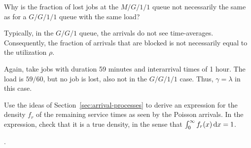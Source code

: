 \begin{question}
  Why is the fraction of lost jobs at the $M/G/1/1$ queue not
  necessarily the same as for a $G/G/1/1$ queue with the same load?  
  \begin{solution}
 Typically, in the $G/G/1$ queue, the arrivals do not see  time-averages. Consequently, the fraction of arrivals that are blocked is not necessarily equal to the utilization $\rho$.

  Again, take jobs with duration 59 minutes and interarrival times of
  1 hour. The load is $59/60$, but no job is lost, also not in the
  $G/G/1/1$ case. Thus, $\gamma=\lambda$ in this case.
  \end{solution}
\end{question}


\begin{question}[use=false]
  Use the ideas of Section~\ref{sec:arrival-processes} to derive an
  expression for the density $f_r$ of the remaining service times as
  seen by the Poisson arrivals.  In the expression, check that it is a
  true density, in the sense that $\int_0^\infty f_r(x) \,\text{d}x =1$.
  \begin{solution}
    \TBD.
  \end{solution}
\end{question}





